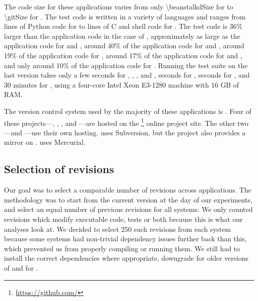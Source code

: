 The code size for these applications varies from only
\SI{\beanstalkdSize}{\eloc} for \beanstalkd to \SI{\gitSize}{\eloc} for \git.
The test code is written in a variety of languages and ranges from
\beanstalkdTsize lines of Python code for \beanstalkd to \gitTsize lines of C
and shell code for \git.  The test code is 36\% larger than the application
code in the case of \git, approximately as large as the application code for
\beanstalkd and \memcached, around 40\% of the application code for \redis and
\zeromq, around 19\% of the application code for \binutils, around 17\% of the
application code for \lighttpd and \vim, and only around 10\% of the
application code for \lighttpdtwo.  Running the test suite on the last version
takes only a few seconds for \binutils, \lighttpd, \lighttpdtwo, \vim and
\zeromq, \memcachedTestTime seconds for \memcached, \redisTestTime seconds for
\redis, and 30 minutes for \git, using a four-core Intel Xeon E3-1280 machine
with 16 GB of RAM.

The version control system used by the majority of these applications is \git.
Four of these projects---\git, \memcached, \redis, and \zeromq ---are hosted on
the \github\footnote{\url{https://github.com/}} online project site.  The other
two---\binutils and \lighttpdtwo---use their own \git hosting. \lighttpd uses
Subversion, but the project also provides a \git mirror on \github. \vim uses
Mercurial.

\subsection{Selection of revisions}

Our goal was to select a comparable number of revisions across applications.
The methodology was to start from the current version at the day of our
experiments, and select an equal number of previous revisions for all systems.
We only counted revisions which modify executable code, tests or both because
this is what our analyses look at. We decided to select 250 such revisions from
each system because some systems had non-trivial dependency issues further back
than this, which prevented us from properly compiling or running them.  We
still had to install the correct dependencies where appropriate, \eg downgrade
 for older versions of \lighttpdtwo and  for
\memcached.

